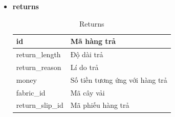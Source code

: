\begin{itemize}
    \item \textbf{returns}
    \begin{table}[H]
        \centering
        \begin{tabular}{|m{3cm}|m{10cm}|}
        \hline 
            id & Mã hàng trả\\ \hline
            return\_length & Độ dài trả\\ \hline
            return\_reason & Lí do trả \\ \hline
            money & Số tiền tương ứng với hàng trả\\ \hline
            fabric\_id & Mã cây vải\\ \hline
            return\_slip\_id & Mã phiếu hàng trả\\ 
        \hline 
        \end{tabular}
        \caption{Returns}
        \label{returns}
    \end{table}


\end{itemize}


\newpage
